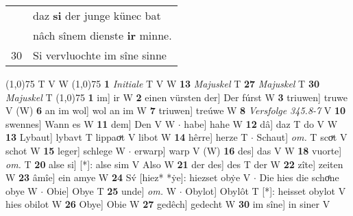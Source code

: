 \documentclass[8pt,a4paper,notitlepage]{article}
\begin{document}
\begin{table}[ht]
\begin{minipage}[t]{0.5\linewidth}
\begin{tabular}{rl}
 & daz \textbf{si} der junge künec bat\\ 
 & nâch sînem dienste \textbf{ir} minne.\\ 
30 & Si vervluochte im sîne sinne\\ 
\end{tabular}
\scriptsize
\line(1,0){75} \newline
T V W \newline
\line(1,0){75} \newline
\textbf{1} \textit{Initiale} T V W  \textbf{13} \textit{Majuskel} T  \textbf{27} \textit{Majuskel} T  \textbf{30} \textit{Majuskel} T  \newline
\line(1,0){75} \newline
\textbf{1} im] ir W \textbf{2} einen vürsten der] Der fúrst W \textbf{3} triuwen] truwe V (W) \textbf{6} an im wol] wol an im W \textbf{7} triuwen] treúwe W \textbf{8} \textit{Versfolge 345.8-7} V  \textbf{10} swennes] Wann es W \textbf{11} dem] Den V W  $\cdot$ habe] hahe W \textbf{12} dâ] daz T do V W \textbf{13} Lybaut] lybavt T lippaoͮt V libot W \textbf{14} hêrre] herze T  $\cdot$ Schaut] \textit{om.} T scoͮt V schot W \textbf{15} leger] schlege W  $\cdot$ erwarp] warp V (W) \textbf{16} des] das V W \textbf{18} vuorte] \textit{om.} T \textbf{20} alse si] [*]: alse sim V Also W \textbf{21} der des] des T der W \textbf{22} zîte] zeiten W \textbf{23} âmîe] ein amye W \textbf{24} Sv́ [hiez* *ẏe]: hiezset obẏe V  $\cdot$ Die hies die schoͤne obye W  $\cdot$ Obie] Obye T \textbf{25} unde] \textit{om.} W  $\cdot$ Obylot] Obylôt T [*]: heisset obylot V hies obilot W \textbf{26} Obye] Obie W \textbf{27} gedêch] gedecht W \textbf{30} im sîne] in siner V \newline
\end{minipage}
\end{table}
\end{document}
